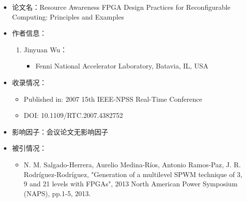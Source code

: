 \begin{itemize}
    \item 论文名：Resource Awareness FPGA Design Practices for Reconfigurable Computing: Principles and Examples

    \item 作者信息：
        \begin{enumerate}
            \item Jinyuan Wu：
                \begin{itemize}
                    \item Fenni National Accelerator Laboratory, Batavia, IL, USA
                \end{itemize}
        \end{enumerate}

    \item 收录情况：
        \begin{itemize}
            \item Published in: 2007 15th IEEE-NPSS Real-Time Conference
            \item DOI: 10.1109/RTC.2007.4382752
        \end{itemize}

    \item 影响因子：会议论文无影响因子

    \item 被引情况：
        \begin{itemize}
            \item N. M. Salgado-Herrera, Aurelio Medina-Ríos, Antonio Ramos-Paz, J. R. Rodríguez-Rodríguez, "Generation of a multilevel SPWM technique of 3, 9 and 21 levels with FPGAs", 2013 North American Power Symposium (NAPS), pp.1-5, 2013.
        \end{itemize}
\end{itemize}

